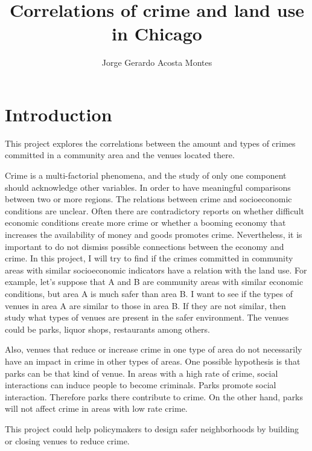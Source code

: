 \documentclass[a4paper,12pt]{article}
\title{ \vspace{-50pt} Correlations of crime and land use in Chicago}
\author{Jorge Gerardo Acosta Montes }
\date{}
\begin{document}
\maketitle
\section{Introduction}
This project explores the correlations between the amount and types of crimes committed in a community area and the venues located there.  

Crime is a multi-factorial phenomena, and the study of only one component should acknowledge other variables. In order to have  meaningful comparisons between two or more regions. The relations between crime and socioeconomic conditions are unclear. Often there are contradictory reports on whether difficult economic conditions create more crime or whether a booming economy that increases the availability of money and goods promotes crime. Nevertheless, it is important to do not dismiss possible connections between the economy and crime. In this project, I will try to find if the crimes committed in community areas with similar socioeconomic indicators have a relation with the land use. For example, let's suppose that  A and B are community areas with similar economic conditions, but area A is much safer than area B. I want to see if the types of venues in area A are similar to those in area B. If they are not similar, then study what types of venues are present in the safer environment.  The venues could be parks, liquor shops, restaurants among others. 

Also, venues that reduce or increase crime in one type of area do not necessarily have an impact in crime in other types of areas.  One possible hypothesis is that parks can be that kind of venue. In areas with a high rate of crime, social interactions can induce people to become criminals. Parks promote social interaction.  Therefore parks there contribute to crime. On the other hand, parks will not affect crime in areas with low rate crime. 

This project could help policymakers to design safer neighborhoods by building or closing venues to reduce crime.
\end{document}

